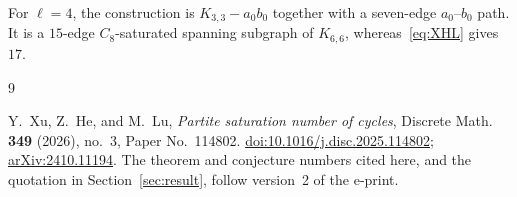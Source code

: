 \documentclass[11pt]{amsart}
\begin{document}
For $\ell=4$, the construction is $K_{3,3}-a_0b_0$ together with a
seven-edge $a_0$--$b_0$ path. It is a $15$-edge $C_8$-saturated
spanning subgraph of $K_{6,6}$, whereas~\eqref{eq:XHL} gives $17$.

\begin{thebibliography}{9}

Y.~Xu, Z.~He, and M.~Lu,
\emph{Partite saturation number of cycles},
Discrete Math. \textbf{349} (2026), no.~3, Paper No.~114802.
\href{https://doi.org/10.1016/j.disc.2025.114802}
{doi:10.1016/j.disc.2025.114802};
\href{https://arxiv.org/abs/2410.11194}{arXiv:2410.11194}.
The theorem and conjecture numbers cited here, and the quotation in
Section~\ref{sec:result}, follow version~2 of the e-print.

\end{thebibliography}
\end{document}
